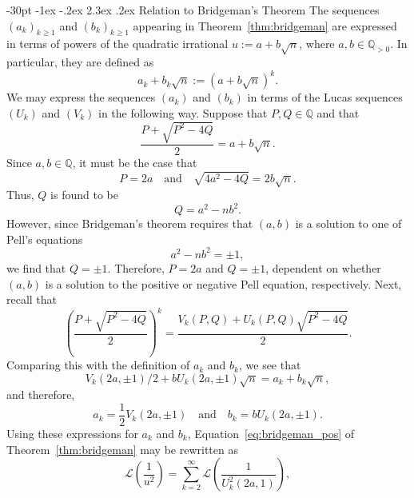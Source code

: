 \documentclass[10pt]{article}
\makeatletter
\renewcommand\section{\@startsection {section}{1}{\z@}
{-30pt \@plus -1ex \@minus -.2ex}
{2.3ex \@plus.2ex}
{\normalfont\normalsize\bfseries\boldmath}}
\theoremstyle{definition}
\makeatother
\begin{document}
\section{Relation to Bridgeman's Theorem}
The sequences $(a_k)_{k \geq 1}$ and $(b_k)_{k \geq 1}$ appearing in Theorem~\ref{thm:bridgeman} are expressed in terms of powers of the quadratic irrational $u := a+b\sqrt{n}$, where $a,b \in \mathbb{Q}_{> 0}$.  In particular, they are defined as
\begin{equation*}
    a_k + b_k\sqrt{n} := (a+b\sqrt{n})^k.
\end{equation*}
We may express the sequences $(a_k)$ and $(b_k)$ in terms of the Lucas sequences $(U_k)$ and $(V_k)$ in the following way. Suppose that $P,Q \in \mathbb{Q}$ and that
\begin{equation*}
    \frac{P+\sqrt{P^2-4Q}}{2} = a+b\sqrt{n}.
\end{equation*}
Since $a,b \in \mathbb{Q}$, it must be the case that
\begin{equation*}
    P = 2a \quad \text{and} \quad \sqrt{4a^2-4Q} = 2b\sqrt{n}.
\end{equation*}
Thus, $Q$ is found to be
\begin{equation*}
    Q = a^2 - n b^2.
\end{equation*}
However, since Bridgeman's theorem requires that $(a,b)$ is a solution to one of Pell's equations
\begin{equation*}
    a^2 - n b^2 = \pm 1,
\end{equation*}
we find that $Q = \pm 1$.  Therefore, $P = 2a$ and $Q = \pm 1$, dependent on whether $(a,b)$ is a solution to the positive or negative Pell equation, respectively.  Next, recall that 
\begin{equation*}
    \left(\frac{P+\sqrt{P^2-4Q}}{2}\right)^k = \frac{V_k(P,Q) + U_k(P,Q)\sqrt{P^2-4Q}}{2}.
\end{equation*}
Comparing this with the definition of $a_k$ and $b_k$, we see that
\begin{equation*}
    V_k(2a,\pm 1)/2 + b U_k(2a,\pm 1) \sqrt{n} = a_k + b_k \sqrt{n},
\end{equation*}
and therefore,
\begin{equation*}
    a_k = \frac{1}{2}V_k(2a,\pm 1) \quad \text{and} \quad b_k = b U_k(2a,\pm 1).
\end{equation*}
Using these expressions for $a_k$ and $b_k$, Equation~\eqref{eq:bridgeman_pos} of Theorem~\ref{thm:bridgeman} may be rewritten as
\begin{equation}
    \mathcal{L}\left(\frac{1}{u^2}\right) = \sum_{k=2}^{\infty}\mathcal{L}\left(\frac{1}{U^2_k(2a,1)}\right), \label{eq:bridgeman-rewritten_a}
\end{equation}
\end{document}
